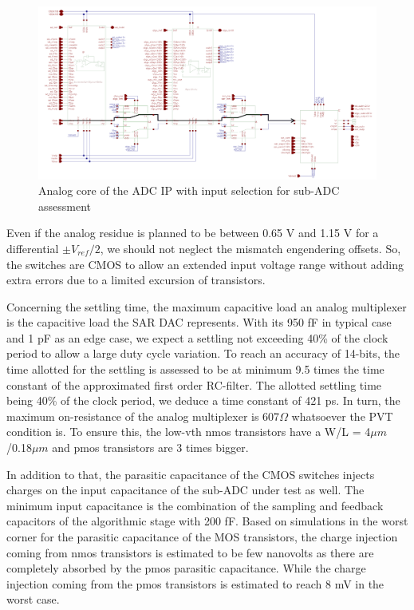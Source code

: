 \begin{figure}[htp]
    \centering
    \includegraphics[width=\textwidth]{Chapter5/Figs/adc_chip/adc-with-test-signal-path.png}
    \caption{Analog core of the ADC IP with input selection for sub-ADC assessment}
    \label{fig:adc-with-test}
\end{figure}

Even if the analog residue is planned to be between 0.65 V and 1.15 V for a differential $\pm V_{ref}/2$, we should not neglect the mismatch engendering offsets. So, the switches are CMOS to allow an extended input voltage range without adding extra errors due to a limited excursion of transistors.

Concerning the settling time, the maximum capacitive load an analog multiplexer is the capacitive load the SAR DAC represents. With its 950 fF in typical case and 1 pF as an edge case, we expect a settling not exceeding 40\% of the clock period to allow a large duty cycle variation. To reach an accuracy of 14-bits, the time allotted for the settling is assessed to be at minimum 9.5 times the time constant of the approximated first order RC-filter. The allotted settling time being 40\% of the clock period, we deduce a time constant of 421 ps. In turn, the maximum on-resistance of the analog multiplexer is 607$\Omega$ whatsoever the PVT condition is. To ensure this, the low-vth nmos transistors have a W/L = 4$\mu m$/0.18$\mu m$ and pmos transistors are 3 times bigger.

In addition to that, the parasitic capacitance of the CMOS switches injects charges on the input capacitance of the sub-ADC under test as well. The minimum input capacitance is the combination of the sampling and feedback capacitors of the algorithmic stage with 200 fF. Based on simulations in the worst corner for the parasitic capacitance of the MOS transistors, the charge injection coming from nmos transistors is estimated to be few nanovolts as there are completely absorbed by the pmos parasitic capacitance. While the charge injection coming from the pmos transistors is estimated to reach 8 mV in the worst case.

